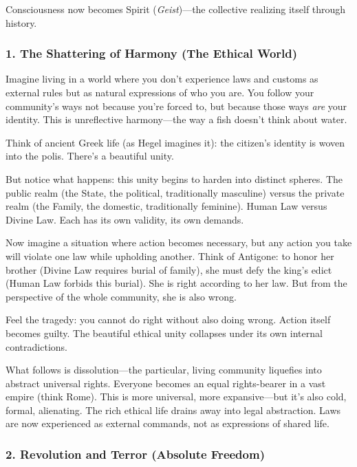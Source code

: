 Consciousness now becomes Spirit (\emph{Geist})---the collective realizing itself through history.

\subsubsection{1. The Shattering of Harmony (The Ethical World)}\label{the-shattering-of-harmony-the-ethical-world}

Imagine living in a world where you don't experience laws and customs as external rules but as natural expressions of who you are. You follow your community's ways not because you're forced to, but because those ways \emph{are} your identity. This is unreflective harmony---the way a fish doesn't think about water.

Think of ancient Greek life (as Hegel imagines it): the citizen's identity is woven into the polis. There's a beautiful unity.

But notice what happens: this unity begins to harden into distinct spheres. The public realm (the State, the political, traditionally masculine) versus the private realm (the Family, the domestic, traditionally feminine). Human Law versus Divine Law. Each has its own validity, its own demands.

Now imagine a situation where action becomes necessary, but any action you take will violate one law while upholding another. Think of Antigone: to honor her brother (Divine Law requires burial of family), she must defy the king's edict (Human Law forbids this burial). She is right according to her law. But from the perspective of the whole community, she is also wrong.

Feel the tragedy: you cannot do right without also doing wrong. Action itself becomes guilty. The beautiful ethical unity collapses under its own internal contradictions.

What follows is dissolution---the particular, living community liquefies into abstract universal rights. Everyone becomes an equal rights-bearer in a vast empire (think Rome). This is more universal, more expansive---but it's also cold, formal, alienating. The rich ethical life drains away into legal abstraction. Laws are now experienced as external commands, not as expressions of shared life.

\subsubsection{2. Revolution and Terror (Absolute Freedom)}\label{revolution-and-terror-absolute-freedom}

